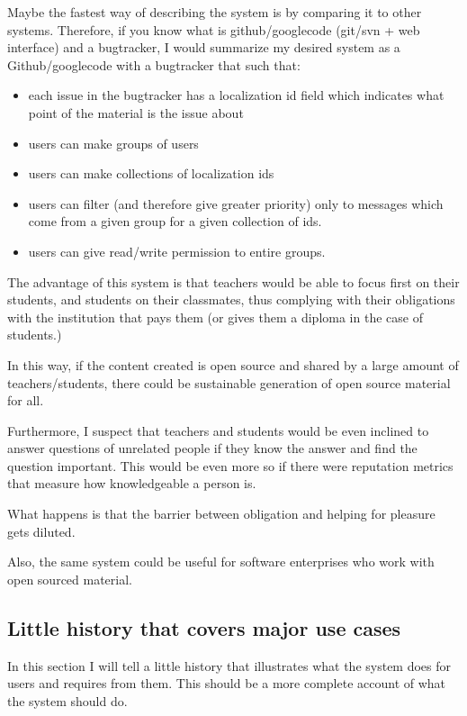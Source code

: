 \documentclass[12pt]{article}
\begin{document}
Maybe the fastest way of describing the system is by comparing it to other systems. Therefore, if you know what is github/googlecode (git/svn + web interface) and a bugtracker, I would summarize my desired system as a Github/googlecode with a bugtracker that such that:

\begin{itemize}
  \item each issue in the bugtracker has a localization id field which indicates what point of the material is the issue about
  \item users can make groups of users
  \item users can make collections of localization ids
  \item users can filter (and therefore give greater priority) only to messages which come from a given group for a given collection of ids.
  \item users can give read/write permission to entire groups.
\end{itemize}

The advantage of this system is that teachers would be able to focus first on their students, and students on their classmates, thus complying with their obligations with the institution that pays them (or gives them a diploma in the case of students.)

In this way, if the content created is open source and shared by a large amount of teachers/students, there could be sustainable generation of open source material for all.

Furthermore, I suspect that teachers and students would be even inclined to answer questions of unrelated people if they know the answer and find the question important. This would be even more so if there were reputation metrics that measure how knowledgeable a person is.

What happens is that the barrier between obligation and helping for pleasure gets diluted.

Also, the same system could be useful for software enterprises who work with open sourced material.

\subsection{Little history that covers major use cases} \label{use-cases-history}

In this section I will tell a little history that illustrates what the system does for users and requires from them. This should be a more complete account of what the system should do.
\end{document}

